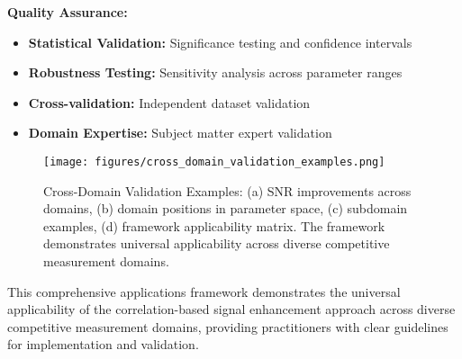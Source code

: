 \textbf{Quality Assurance:}
\begin{itemize}
    \item \textbf{Statistical Validation:} Significance testing and confidence intervals
    \item \textbf{Robustness Testing:} Sensitivity analysis across parameter ranges
    \item \textbf{Cross-validation:} Independent dataset validation
    \item \textbf{Domain Expertise:} Subject matter expert validation
\end{itemize}

\begin{figure}[h]
\centering
\texttt{[image: figures/cross\_domain\_validation\_examples.png]}
\caption{Cross-Domain Validation Examples: (a) SNR improvements across domains, (b) domain positions in parameter space, (c) subdomain examples, (d) framework applicability matrix. The framework demonstrates universal applicability across diverse competitive measurement domains.}
\label{fig:cross_domain}
\end{figure}

This comprehensive applications framework demonstrates the universal applicability of the correlation-based signal enhancement approach across diverse competitive measurement domains, providing practitioners with clear guidelines for implementation and validation.
